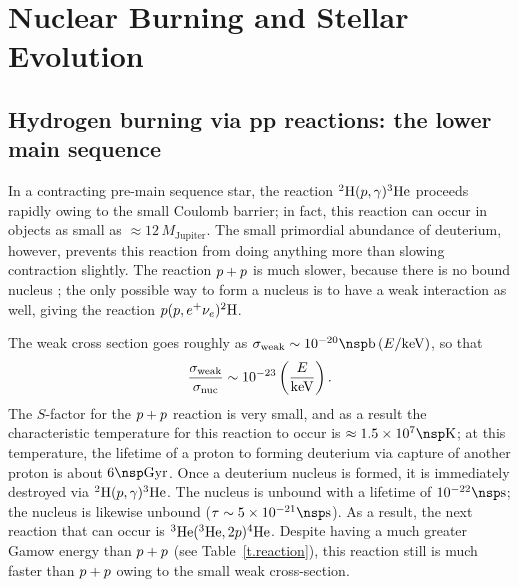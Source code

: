 \chapter{Nuclear Burning and Stellar Evolution}

\section[The pp chain]{Hydrogen burning via pp reactions: the lower main sequence}
\label{s.lower-ms}

In a contracting pre-main sequence star, the reaction $\hydrogen[2](p,\gamma)\helium[3]$ proceeds rapidly owing to the small Coulomb barrier; in fact, this reaction can occur in objects as small as $\approx 12\,M_{\mathrm{Jupiter}}$.  The small primordial abundance of deuterium, however, prevents this reaction from doing anything more than slowing contraction slightly.  The reaction $\pt +\pt$ is much slower, because there is no bound nucleus \helium[2]; the only possible way to form a nucleus is to have a weak interaction as well, giving the reaction $\pt(\pt,e^{+}\nu_{e})\hydrogen[2]$.

The weak cross section goes roughly as $\sigma_{\mathrm{weak}} \sim 10^{-20}\nsp\barn\left(E/\keV\right)$, so that
\[ \frac{\sigma_{\mathrm{weak}}}{\sigma_{\mathrm{nuc}}} \sim 10^{-23}\left(\frac{E}{\keV}\right). \]
The $S$-factor for the $\pt+\pt$ reaction is very small, and as a result the characteristic temperature for this reaction to occur is $\approx 1.5\ee{7}\nsp\K$; at this temperature, the lifetime of a proton to forming deuterium via capture of another proton is about $6\nsp\Giga\yr$.  Once a deuterium nucleus is formed, it is immediately destroyed via $\hydrogen[2](p,\gamma)\helium[3]$. The nucleus \lithium[4] is unbound with a lifetime of $10^{-22}\nsp\second$; the nucleus \beryllium[6] is likewise unbound ($\tau \sim 5\ee{-21}\nsp\second$). As a result, the next reaction that can occur is $\helium[3](\helium[3],2\pt)\helium$.  Despite having a much greater Gamow energy than $\pt + \pt$ (see Table~\ref{t.reaction}), this reaction still is much faster than $\pt+\pt$ owing to the small weak cross-section.


